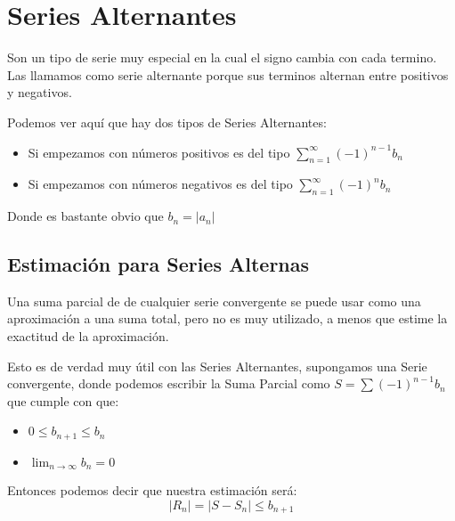 \documentclass[12pt]{report}							    %
\begin{document}
    \clearpage
    \section{Series Alternantes}

        Son un tipo de serie muy especial en la cual el signo cambia con cada
        termino. Las llamamos como serie alternante porque sus terminos alternan
        entre positivos y negativos.

        Podemos ver aquí que hay dos tipos de Series Alternantes:
        \begin{itemize}
            \item Si empezamos con números positivos es del tipo
                $\sum_{n=1}^{\infty} (-1)^{n-1} b_n$
            
            \item Si empezamos con números negativos es del tipo
            $\sum_{n=1}^{\infty} (-1)^n b_n$
        \end{itemize}

        Donde es bastante obvio que $b_n = |a_n|$


    \subsection{Estimación para Series Alternas}
        Una suma parcial de de cualquier serie convergente se puede usar como una
        aproximación a una suma total, pero no es muy utilizado, a menos que estime
        la exactitud de la aproximación.

        Esto es de verdad muy útil con las Series Alternantes, supongamos una Serie
        convergente, donde podemos escribir la Suma Parcial como $S = \sum (-1)^{n-1}b_n$
        que cumple con que:
        \begin{itemize}
            \item $ 0 \leq b_{n+1} \leq b_n$
            \item $ \lim_{n \to \infty} b_n = 0$
        \end{itemize}

        Entonces podemos decir que nuestra estimación será:
        \begin{equation}
            |R_n| = |S - S_n| \leq b_{n+1}
        \end{equation}
\end{document}
